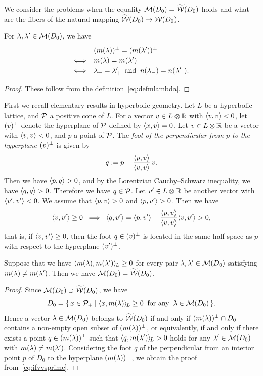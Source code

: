 \documentclass{amsart} %
\begin{document}
%
We consider the problems when 
the equality $\mathord{\mathcal{M}}(D_0)=\widetilde{\mathord{\mathcal{W}}} (D_0)$ holds and 
what are the fibers of the natural mapping $\widetilde{\mathord{\mathcal{W}}} (D_0)\to \mathord{\mathcal{W}}(D_0)$.
%
\begin{lemma}\label{lem:mmequal}
For $\lambda, \lambda^{\prime}\in \mathord{\mathcal{M}}(D_0)$, we have 
\[
\renewcommand{\arraystretch}{1.2}
\begin{array}{cl}
&(m(\lambda))\sperp=(m(\lambda\sprime))\sperp\\
\Longleftrightarrow & m(\lambda)=m(\lambda\sprime) \\
\Longleftrightarrow & \lambdaplus=\lambdaplus\sprime\;\;\textrm{and}\;\; 
n(\lambdaminus)=n(\lambdaminus\sprime).
\end{array}
\]
\end{lemma}
%
\begin{proof}
These follow from the definition~\eqref{eq:defmlambda}.
\end{proof}
%
%
First we recall elementary results in hyperbolic geometry.
Let $L$ be a hyperbolic lattice, and $\mathord{\mathcal{P}}$ a positive cone of $L$.
For a vector $v\in L\otimes\mathord{\mathbb{R}}$ with $\langle v, v \rangle<0$,
let $(v)^{\perp}$ denote the hyperplane of $\mathord{\mathcal{P}}$ defined by $\langle x, v \rangle=0$.
Let $v\in L\otimes\mathord{\mathbb{R}}$ be a vector with $\langle v, v \rangle<0$, and 
$p$ a point of $\mathord{\mathcal{P}}$.
The \emph{foot of the perpendicular from $p$ to the hyperplane $(v)^{\perp}$ }
is given by
\[
q:=p-\frac{\langle p, v \rangle}{\langle v,v \rangle}\, v.
\]
Then we have $\langle p, q \rangle>0$, and 
by the Lorentzian Cauchy--Schwarz inequality,
we have $\langle q, q \rangle>0$.
Therefore we have 
$q\in \mathord{\mathcal{P}}$.
Let $v^{\prime}\in L\otimes\mathord{\mathbb{R}}$ be another vector with $\langle v^{\prime}, v^{\prime} \rangle<0$.
We assume that $\langle p, v \rangle>0$ and $\langle p, v^{\prime} \rangle>0$.
Then we have
%
\begin{equation}\label{eq:ifvvsprime}
\langle v, v^{\prime} \rangle\ge 0 \;\;\Longrightarrow \;\; \langle q, v^{\prime} \rangle=
\langle p, v^{\prime} \rangle-\dfrac{\langle p, v \rangle}{\langle v,v \rangle} \langle v, v^{\prime} \rangle>0,
\end{equation}
%
that is, if $\langle v, v^{\prime} \rangle\ge 0$, 
then the foot $q\in (v)^{\perp}$ is located in the same half-space as $p$ with respect to the hyperplane 
$(v^{\prime})^{\perp}$.
%
\begin{lemma}\label{lem:pairsofMMM}
Suppose that we have
$\langle m(\lambda), m(\lambda^{\prime}) \rangle_{\hskip -1pt L}\ge 0$
for every  pair $\lambda, \lambda^{\prime}\in  \mathord{\mathcal{M}}(D_0)$
satisfying  $m(\lambda)\ne m(\lambda^{\prime})$.
Then we have 
$\mathord{\mathcal{M}}(D_0)=\widetilde{\mathord{\mathcal{W}}} (D_0)$.
\end{lemma}
%
\begin{proof}
Since $\mathord{\mathcal{M}}(D_0)\supset \widetilde{\mathord{\mathcal{W}}} (D_0)$,
 we have 
 \[
 D_0=\{\,{x\in \mathord{\mathcal{P}}_{+}}\mid {\langle x, m(\lambda) \rangle_{\hskip -1pt L}\ge 0\;\; \textrm{for any} \;\; \lambda\in \mathord{\mathcal{M}}(D_0)} \,\}.
\]
Hence a vector $\lambda\in \mathord{\mathcal{M}}(D_0)$ belongs to $\widetilde{\mathord{\mathcal{W}}} (D_0)$
if and only if 
$(m(\lambda))^{\perp} \cap D_0$ contains a non-empty open subset of $(m(\lambda))^{\perp} $,
or equivalently,
if and only if 
there exists a point $q\in (m(\lambda))^{\perp}$
such that $\langle q, m(\lambda^{\prime}) \rangle_{\hskip -1pt L}> 0$ holds for any $\lambda^{\prime}\in \mathord{\mathcal{M}}(D_0)$
with $m(\lambda)\ne m(\lambda^{\prime})$.
Considering the foot $q$ of 
the perpendicular from an interior point $p$ of $D_0$
to the hyperplane $(m(\lambda))^{\perp}$,
we obtain the proof from~\eqref{eq:ifvvsprime}.
\end{proof}
\end{document}
